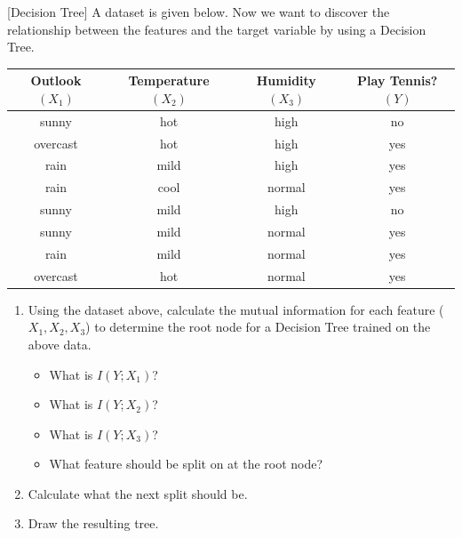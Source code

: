 \item {} [Decision Tree] A dataset is given below. Now we want to discover the relationship between the features and the target variable by using a Decision Tree.
\
\begin{table}[h]
    \centering
    \begin{tabular}{|c|c|c|c|}
        \hline
        Outlook $\left(X_{1}\right)$ & Temperature $\left(X_{2}\right)$ & Humidity $\left(X_{3}\right)$ & Play Tennis? $(Y)$ \\
        \hline
        sunny & hot & high & no \\
        \hline
        overcast & hot & high & yes \\
        \hline
        rain & mild & high & yes \\
        \hline
        rain & cool & normal & yes \\
        \hline
        sunny & mild & high & no \\
        \hline
        sunny & mild & normal & yes \\
        \hline
        rain & mild & normal & yes \\
        \hline
        overcast & hot & normal & yes \\
        \hline
    \end{tabular}
\end{table}

\begin{enumerate}
    \item Using the dataset above, calculate the mutual information for each feature ($X_{1}, X_{2}, X_{3}$) to determine the root node for a Decision Tree trained on the above data.
    \begin{itemize}
        \item What is $I\left(Y ; X_{1}\right)$? 
        \item What is $I\left(Y ; X_{2}\right)$? 
        \item What is $I\left(Y ; X_{3}\right)$? \defpoints{3}
        \item What feature should be split on at the root node? 
    \end{itemize}

    \item Calculate what the next split should be. 

    \item Draw the resulting tree. 
\end{enumerate}

